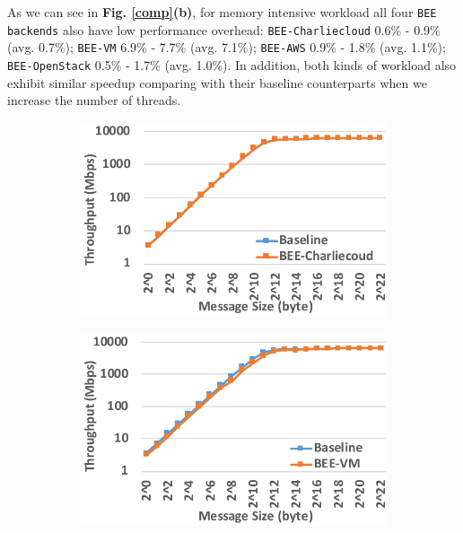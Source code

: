 As we can see in \textbf{Fig. \ref{comp}(b)}, for memory intensive workload all four \texttt{BEE backends} also have low performance overhead: \texttt{BEE-Charliecloud} 0.6\% - 0.9\% (avg. 0.7\%); \texttt{BEE-VM} 6.9\% - 7.7\% (avg. 7.1\%); \texttt{BEE-AWS} 0.9\% - 1.8\% (avg. 1.1\%); \texttt{BEE-OpenStack} 0.5\% - 1.7\% (avg. 1.0\%). In addition, both kinds of workload also exhibit similar speedup comparing with their baseline counterparts when we increase the number of threads.

 \begin{figure}[t]
    \centering
    \begin{subfigure}[t]{0.245\textwidth}
        \includegraphics[width=\textwidth]{figures/band-bee-cc.pdf}
    \end{subfigure}
    \begin{subfigure}[t]{0.245\textwidth}
        \includegraphics[width=\textwidth]{figures/band-bee-vm.pdf}
    \end{subfigure}

\end{figure}
